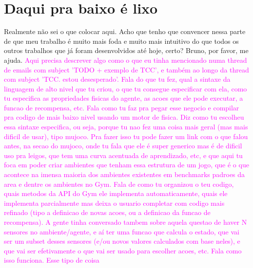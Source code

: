 \documentclass[cic,tc]{iiufrgs}
\newcommand\bruno[1]{\textcolor{magenta}{#1}}
\begin{document}
\section{Daqui pra baixo é lixo}

Realmente não sei o que colocar aqui. Acho que tenho que convencer nessa parte de que meu trabalho é muito mais foda e muito
mais intuitivo do que todos os outros trabalhos que já foram desenvolvidos até hoje, certo?
Bruno, por favor, me ajuda.
\bruno{Aqui precisa descrever algo como o que eu tinha mencionado numa thread de emails com subject 'TODO + exemplo de TCC', e também ao longo da thread com subject 'TCC. estou desesperado'. Fala do que tu fez, qual a sintaxe da linguagem de alto nivel que tu criou, o que tu consegue especificar com ela, como tu especifica as propriedades fisicas do agente, as acoes que ele pode executar, a funcao de recompensa, etc. Fala como tu faz pra pegar esse negocio e compilar pra codigo de mais baixo nivel usando um motor de fisica. Diz como tu escolheu essa sintaxe especifica, ou seja, porque tu nao fez uma coisa mais geral (mas mais dificil de usar), tipo mujoco. Pra fazer isso tu pode fazer um link com o que falou antes, na secao do mujoco, onde tu fala que ele é super generico mas é de dificil uso pra leigos, que tem uma curva acentuada de aprendizado, etc, e que aqui tu foca em poder criar ambientes que tenham essa estrutura de um jogo, que é o que acontece na imensa maioria dos ambientes existentes em benchmarks padroes da area e dentre os ambientes no Gym. Fala de como tu organizou o teu codigo, quais metodos da API do Gym ele implementa automaticamente, quais ele implementa parcialmente mas deixa o usuario completar com codigo mais refinado (tipo a definicao de novas acoes, ou a definicao da funcao de recompensa). A gente tinha conversado tambem sobre aquela questao de haver N sensores no ambiente/agente, e aí ter uma funcao que calcula o estado, que vai ser um subset desses sensores (e/ou novos valores calculados com base neles), e que vai ser efetivamente o que vai ser usado para escolher acoes, etc. Fala como isso funciona. Esse tipo de coisa}
\end{document}
